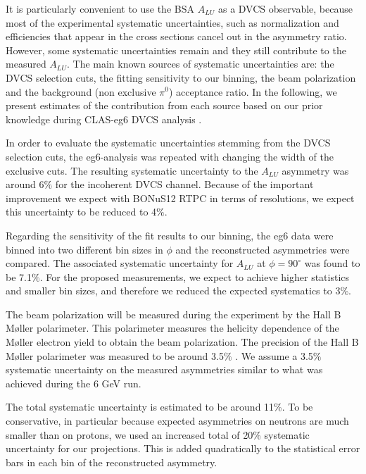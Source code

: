 It is particularly convenient to use the BSA $A_{LU}$ as a DVCS observable, 
because most of the experimental systematic uncertainties, such as 
normalization and efficiencies that appear in the cross sections cancel out in 
the asymmetry ratio. However, some systematic uncertainties remain and they 
still contribute to the measured $A_{LU}$. The main known sources of systematic 
uncertainties are: the DVCS selection cuts, the fitting sensitivity to our 
binning, the beam polarization and the background (non exclusive $\pi^0$) 
acceptance ratio. In the following, we present estimates of the contribution 
from each source based on our prior knowledge during CLAS-eg6 DVCS analysis 
\cite{eg6_note}.

In order to evaluate the systematic uncertainties stemming from the DVCS 
selection cuts, the eg6-analysis was repeated with changing the width of the 
exclusive cuts. The resulting systematic uncertainty to the $A_{LU}$ asymmetry
was around 6$\%$ for the incoherent DVCS channel. Because of the important 
improvement we expect with BONuS12 RTPC in terms of resolutions, we expect this 
uncertainty to be reduced to 4$\%$.

Regarding the sensitivity of the fit results to our binning, the eg6 data were 
binned into two different bin sizes in $\phi$ and the reconstructed asymmetries 
were compared. The associated systematic uncertainty for $A_{LU}$ at $\phi = 90 
^{\circ}$ was found to be 7.1$\%$. For the proposed measurements, we expect to 
achieve higher statistics and smaller bin sizes, and therefore we reduced the 
expected systematics to 3$\%$.
   
The beam polarization will be measured during the experiment by the Hall B 
M\o{}ller polarimeter. This polarimeter measures the helicity dependence of the 
M\o{}ller electron yield to obtain the beam polarization. The precision of the 
Hall B M\o{}ller polarimeter was measured to be around 3.5$\%$ 
\cite{PhysRevSTAB.7.042802}.  We assume a 3.5$\%$ systematic uncertainty on the 
measured asymmetries similar to what was achieved during the 6 GeV run.

The total systematic uncertainty is estimated to be around 11\%. To be 
conservative, in particular because expected asymmetries on neutrons are
much smaller than on protons, we used an increased total of 20\% 
systematic uncertainty for our projections. This is added quadratically to the statistical error 
bars in each bin of the reconstructed asymmetry.

